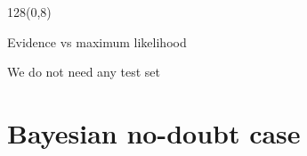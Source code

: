 \documentclass[shownotes]{beamer}
\begin{document}
\begin{frame}
\begin{textblock}{128}(0,8)
\begin{center}
 \normalsize Evidence vs maximum likelihood
\end{center}
\end{textblock}
\vspace{1cm}

\begin{mdframed}[backgroundcolor=black!15]
\centering \Large
We do not need any test set
\end{mdframed}





\end{frame}


\section{Bayesian no-doubt case}
\end{document}
